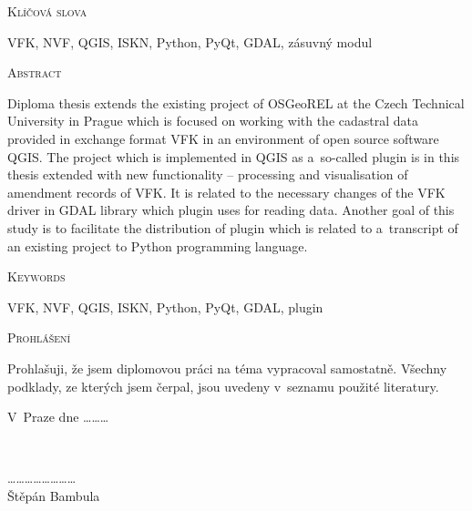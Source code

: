 \documentclass[a4paper,12pt,oneside]{book}
\begin{document}
\vspace{32pt}

\noindent
\textsc{\Large Klíčová slova}

\vspace{12pt}

VFK, NVF, QGIS, ISKN, Python, PyQt, GDAL, zásuvný modul


\vfill

\noindent
\textsc{\Large Abstract}

\vspace{12pt}

Diploma thesis extends the existing project of OSGeoREL at the Czech Technical University in Prague which is focused on working with the cadastral data provided in exchange format VFK in an environment of open source software QGIS. The project which is implemented in QGIS as a~so-called plugin is in this thesis extended with new functionality -- processing and visualisation of amendment records of VFK. It is related to the necessary changes of the VFK driver in GDAL library which plugin uses for reading data. Another goal of this study is to facilitate the distribution of plugin which is related to a~transcript of an existing project to Python programming language.

\vspace{32pt}

\noindent
\textsc{\Large Keywords}

\vspace{12pt}
VFK, NVF, QGIS, ISKN, Python, PyQt, GDAL, plugin


\vfill

\clearpage
\vspace*{\fill}

\noindent
\textsc{\Large Prohlášení}

\vspace{12pt}
Prohlašuji, že jsem diplomovou práci na téma  vypracoval samostatně. Všechny podklady, ze kterých jsem čerpal, jsou uvedeny v~seznamu použité literatury.

\vspace{24pt}
\noindent
\begin{minipage}{0.4\textwidth}
\begin{flushleft}
\center 
V~Praze dne \dots \dots \dots \\
\end{flushleft}
\end{minipage}
~
\begin{minipage}{0.8\textwidth}
\begin{flushright} 
\vspace{20pt}
\center
\dots \dots \dots \dots \dots \dots \dots \dots \\
Štěpán Bambula
\end{flushright}
\end{minipage}\\[2cm]
\end{document}
